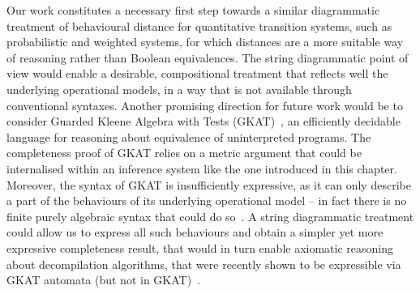 Our work constitutes a necessary first step towards a similar diagrammatic treatment of behavioural distance for quantitative transition systems, such as probabilistic and weighted systems, for which distances are a more suitable way of reasoning rather than Boolean equivalences. The string diagrammatic point of view would enable a desirable, compositional treatment that reflects well the underlying operational models, in a way that is not available through conventional syntaxes. Another promising direction for future work would be to consider Guarded Kleene Algebra with Tests (GKAT)~\cite{Smolka:2020:Guarded,Schmid:2021:Guarded}, an efficiently decidable language for reasoning about equivalence of uninterpreted programs. The completeness proof of GKAT relies on a metric argument that could be internalised within an inference system like the one introduced in this chapter. Moreover, the syntax of GKAT is insufficiently expressive, as it can only describe a part of the behaviours of its underlying operational model -- in fact there is no finite purely algebraic syntax that could do so~\cite{Cate:2025:Algebras}. A string diagrammatic treatment could allow us to express all such behaviours and obtain a simpler yet more expressive completeness result, that would in turn enable axiomatic reasoning about decompilation algorithms, that were recently shown to be expressible via GKAT automata (but not in GKAT)~\cite{Zhang:2025:CFGKAT}.
 